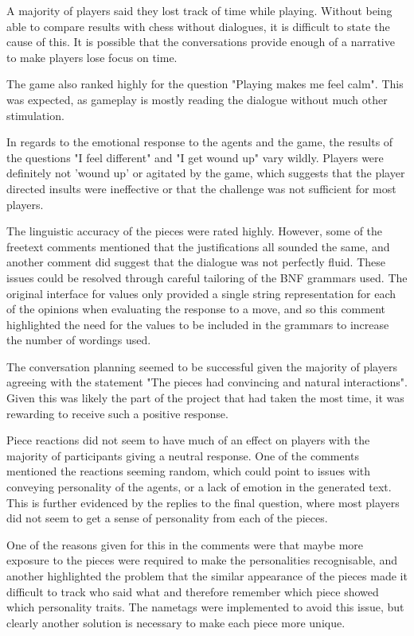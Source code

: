 \documentclass{article}
\begin{document}
A majority of players said they lost track of time while playing. Without being able to compare results with chess without dialogues, it is difficult to state the cause of this. It is possible that the conversations provide enough of a narrative to make players lose focus on time. 

The game also ranked highly for the question "Playing makes me feel calm". This was expected, as gameplay is mostly reading the dialogue without much other stimulation.

In regards to the emotional response to the agents and the game, the results of the questions "I feel different" and "I get wound up" vary wildly. Players were definitely not 'wound up' or agitated by the game, which suggests that the player directed insults were ineffective or that the challenge was not sufficient for most players.

The linguistic accuracy of the pieces were rated highly. However, some of the freetext comments mentioned that the justifications all sounded the same, and another comment did suggest that the dialogue was not perfectly fluid. These issues could be resolved through careful tailoring of the BNF grammars used. The original interface for values only provided a single string representation for each of the opinions when evaluating the response to a move, and so this comment highlighted the need for the values to be included in the grammars to increase the number of wordings used.

The conversation planning seemed to be successful given the majority of players agreeing with the statement "The pieces had convincing and natural interactions". Given this was likely the part of the project that had taken the most time, it was rewarding to receive such a positive response.

Piece reactions did not seem to have much of an effect on players with the majority of participants giving a neutral response. One of the comments mentioned the reactions seeming random, which could point to issues with conveying personality of the agents, or a lack of emotion in the generated text. This is further evidenced by the replies to the final question, where most players did not seem to get a sense of personality from each of the pieces.

One of the reasons given for this in the comments were that maybe more exposure to the pieces were required to make the personalities recognisable, and another highlighted the problem that the similar appearance of the pieces made it difficult to track who said what and therefore remember which piece showed which personality traits. The nametags were implemented to avoid this issue, but clearly another solution is necessary to make each piece more unique.
\end{document}
